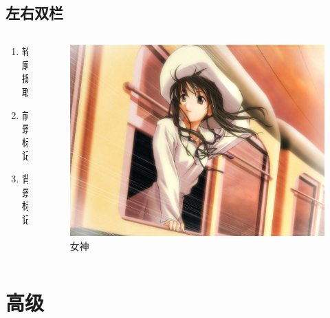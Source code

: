 \documentclass{./banyuan-ppt}
\begin{document}
\subsection{左右双栏}
\begin{frame}
    \begin{columns}
        \begin{column}{.3\textwidth}
            \begin{enumerate}
                \item 轮廓提取 
                \item 前景标记
                \item 背景标记
            \end{enumerate}
        \end{column}

        \begin{column}{.6\textwidth}
            \begin{figure}
                \includegraphics[width=\midpicwidth]{./res/sample.png}
                \caption{女神}
            \end{figure}
        \end{column}
    \end{columns}
\end{frame}

\section{高级}
\end{document}
